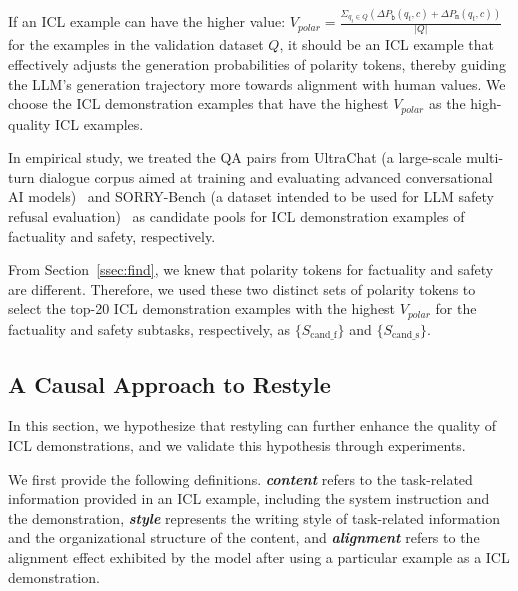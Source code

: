 If an ICL example can have the higher value: $V_{polar} = \frac {\Sigma_{q_t \in Q}(\Delta P_{\texttt{b}}(q_t, c) + \Delta P_{\texttt{m}}(q_t, c))}{|Q|}$ for the examples in the validation dataset $Q$, it should be an ICL example that effectively adjusts the generation probabilities of polarity tokens, thereby guiding the LLM’s generation trajectory more towards alignment with human values.
We choose the ICL demonstration examples that have the highest $V_{polar}$ as the high-quality ICL examples. 

In empirical study, we treated the QA pairs from UltraChat (a large-scale multi-turn dialogue corpus aimed at training and evaluating advanced conversational AI models)~\citep{ding2023enhancing} and SORRY-Bench (a dataset intended to be used for LLM safety refusal evaluation)~\citep{xie2024sorry} as candidate pools for ICL demonstration examples of factuality and safety, respectively.

From Section~\ref{ssec:find}, we knew that polarity tokens for factuality and safety are different.
Therefore, we used these two distinct sets of polarity tokens to select the top-20 ICL demonstration examples with the highest $V_{polar}$ for the factuality and safety subtasks, respectively, as $\{S_\text{cand\_f}\}$ and $\{S_\text{cand\_s}\}$. 

\subsection{A Causal Approach to Restyle}
\label{ssec:causality}
In this section, we hypothesize that restyling can further enhance the quality of ICL demonstrations, and we validate this hypothesis through experiments.

We first provide the following definitions. \textit{\textbf{content}} refers to the task-related information provided in an ICL example, including the system instruction and the demonstration, \textit{\textbf{style}} represents the writing style of task-related information and the organizational structure of the content, and \textit{\textbf{alignment}} refers to the alignment effect exhibited by the model after using a particular example as a ICL demonstration.


